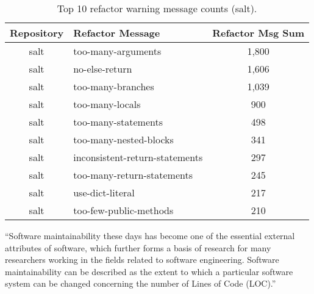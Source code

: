 \begin{table}[ht]
  \centering
  \begin{tabularx}{1.0\textwidth} {
    | c
    | >{\centering\arraybackslash}X 
    | c |
  }
    \hline
      Repository & Refactor Message & Refactor Msg Sum \\
    \hline\hline
      salt & too-many-arguments & 1,800 \\
      salt & no-else-return & 1,606 \\
      salt & too-many-branches & 1,039 \\
      salt & too-many-locals & 900 \\
      salt & too-many-statements & 498 \\
      salt & too-many-nested-blocks & 341 \\
      salt & inconsistent-return-statements & 297 \\
      salt & too-many-return-statements & 245 \\
      salt & use-dict-literal & 217 \\
      salt & too-few-public-methods & 210 \\
    \hline
  \end{tabularx}
  \caption{Top 10 refactor warning message counts (salt).}
  \label{table:refactorMessagesSalt}
\end{table}

\vspace{0.25cm}
\begin{displayquote}
  ``Software maintainability these days has become one of the essential external attributes of software, which further forms a basis of research for many researchers working in the fields related to software engineering. Software maintainability can be described as the extent to which a particular software system can be changed concerning the number of Lines of Code (LOC).'' \cite{gupta:2021}
\end{displayquote}
\vspace{0.25cm}
